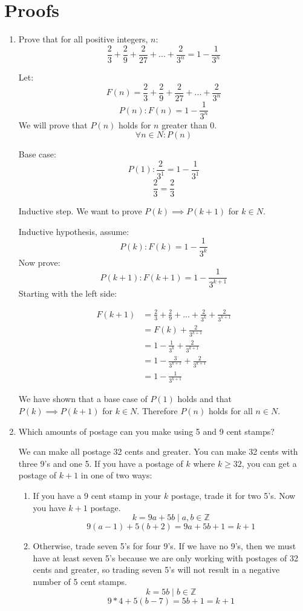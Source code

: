 \documentclass{article}
\begin{document}
\section{Proofs}
\begin{enumerate}
\item Prove that for all positive integers, $n$:
\[ \frac{2}{3} + \frac{2}{9} + \frac{2}{27} + ... + \frac{2}{3^n} = 1 - \frac{1}{3^n} \]

Let:
\[ F(n) = \frac{2}{3} + \frac{2}{9} + \frac{2}{27} + ... + \frac{2}{3^n} \]
\[ P(n): F(n) = 1 - \frac{1}{3^n} \]
We will prove that $P(n)$ holds for $n$ greater than 0.
\[ \forall n \in N : P(n) \]

Base case:
\[ P(1): \frac{2}{3^1} = 1 - \frac{1}{3^1} \]
\[ \frac{2}{3} = \frac{2}{3} \]

Inductive step. We want to prove $P(k) \implies P(k+1)$ for $k \in N$.

Inductive hypothesis, assume:
\[ P(k): F(k) = 1 - \frac{1}{3^k} \]
Now prove:
\[ P(k + 1): F(k + 1) = 1 - \frac{1}{3^{k + 1}} \]
Starting with the left side:

\begin{equation*}
\begin{aligned}
F(k + 1) &= \frac{2}{3} + \frac{2}{9} + ... + \frac{2}{3^k} + \frac{2}{3^{k + 1}} \\
&= F(k) + \frac{2}{3^{k + 1}} \\
&= 1 - \frac{1}{3^k} + \frac{2}{3^{k + 1}} \\
&= 1 - \frac{3}{3^{k + 1}} + \frac{2}{3^{k + 1}} \\
&= 1 - \frac{1}{3^{k + 1}}
\end{aligned}
\end{equation*}

We have shown that a base case of $P(1)$ holds and that $P(k) \implies P(k + 1)$ for $k \in N$. Therefore $P(n)$ holds for all $n \in N$.


\item Which amounts of postage can you make using 5 and 9 cent stamps?

We can make all postage 32 cents and greater. You can make 32 cents with three 9's and one 5. If you have a postage of $k$ where $k \geq 32$, you can get a postage of $k + 1$ in one of two ways:
  \begin{enumerate}
  \item If you have a 9 cent stamp in your $k$ postage, trade it for two 5's. Now you have $k + 1$ postage.
\[ k = 9a + 5b \mid a,b \in \mathbb Z \]
\[ 9(a - 1) + 5(b + 2) = 9a + 5b + 1 = k + 1\]
  \item Otherwise, trade seven 5's for four 9's. If we have no 9's, then we must have at least seven 5's because we are only working with postages of 32 cents and greater, so trading seven 5's will not result in a negative number of 5 cent stamps.
\[ k = 5b \mid b \in \mathbb Z \]
\[ 9 * 4 + 5(b - 7) = 5b + 1 = k + 1 \]
  \end{enumerate}


\end{enumerate}
\end{document}
